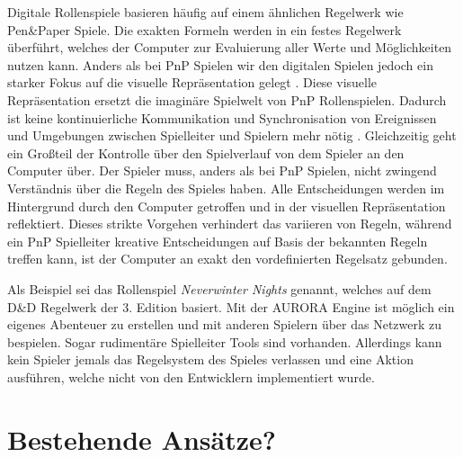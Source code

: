Digitale Rollenspiele basieren häufig auf einem ähnlichen Regelwerk wie Pen\&Paper Spiele. Die exakten Formeln werden in ein festes Regelwerk überführt, welches der Computer zur Evaluierung aller Werte und Möglichkeiten nutzen kann. Anders als bei PnP Spielen wir den digitalen Spielen jedoch ein starker Fokus auf die visuelle Repräsentation gelegt \cite{Tychsen2006}. Diese visuelle Repräsentation ersetzt die imaginäre Spielwelt von PnP Rollenspielen. Dadurch ist keine kontinuierliche Kommunikation und Synchronisation von Ereignissen und Umgebungen zwischen Spielleiter und Spielern mehr nötig \cite{Drachen2008}. \newline
Gleichzeitig geht ein Großteil der Kontrolle über den Spielverlauf von dem Spieler an den Computer über. Der Spieler muss, anders als bei PnP Spielen, nicht zwingend Verständnis über die Regeln des Spieles haben. Alle Entscheidungen werden im Hintergrund durch den Computer getroffen und in der visuellen Repräsentation reflektiert. Dieses strikte Vorgehen verhindert das variieren von Regeln, während ein PnP Spielleiter kreative Entscheidungen auf Basis der bekannten Regeln treffen kann, ist der Computer an exakt den vordefinierten Regelsatz gebunden. \cite{Drachen2008}

Als Beispiel sei das Rollenspiel \emph{Neverwinter Nights} genannt, welches auf dem D\&D Regelwerk der 3. Edition basiert. Mit der AURORA Engine ist möglich ein eigenes Abenteuer zu erstellen und mit anderen Spielern über das Netzwerk zu bespielen. Sogar rudimentäre Spielleiter Tools sind vorhanden. Allerdings kann kein Spieler jemals das Regelsystem des Spieles verlassen und eine Aktion ausführen, welche nicht von den Entwicklern implementiert wurde.



\section{Bestehende Ansätze?}
\label{sec:BekannteAnsaetze}

